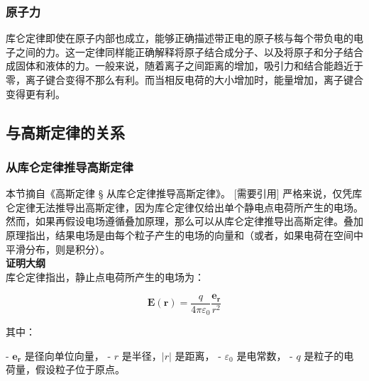 \subsubsection{原子力}    
库仑定律即使在原子内部也成立，能够正确描述带正电的原子核与每个带负电的电子之间的力。这一定律同样能正确解释将原子结合成分子、以及将原子和分子结合成固体和液体的力。一般来说，随着离子之间距离的增加，吸引力和结合能趋近于零，离子键合变得不那么有利。而当相反电荷的大小增加时，能量增加，离子键合变得更有利。
\subsection{与高斯定律的关系}
\subsubsection{从库仑定律推导高斯定律}  
本节摘自《高斯定律 § 从库仑定律推导高斯定律》。  
[需要引用] 严格来说，仅凭库仑定律无法推导出高斯定律，因为库仑定律仅给出单个静电点电荷所产生的电场。然而，如果再假设电场遵循叠加原理，那么可以从库仑定律推导出高斯定律。叠加原理指出，结果电场是由每个粒子产生的电场的向量和（或者，如果电荷在空间中平滑分布，则是积分）。\\
\textbf{证明大纲}\\
库仑定律指出，静止点电荷所产生的电场为：

\[
\mathbf{E}(\mathbf{r}) = \frac{q}{4 \pi \varepsilon_0} \frac{\mathbf{e_r}}{r^2}
\]

其中：

- \(\mathbf{e_r}\) 是径向单位向量，
- \(r\) 是半径，\(|r|\) 是距离，
- \(\varepsilon_0\) 是电常数，
- \(q\) 是粒子的电荷量，假设粒子位于原点。